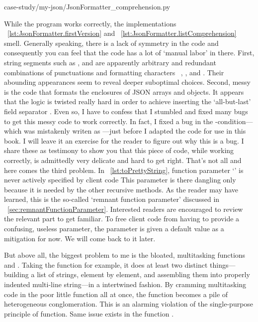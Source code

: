 
{case-study/my-json/JsonFormatter_comprehension.py}

While the program works correctly,
the implementations ~\autoref{lst:JsonFormatter.firstVersion} and
~\autoref{lst:JsonFormatter.listComprehension} smell.
Generally speaking, there is a lack of symmetry in the code and consequently
you can feel that the code has a lot of `manual labor' in there.
First, string segments such as  ,  and
\code{"[\\n"} are apparently arbitrary and redundant combinations of
punctuations and formatting characters
\ , , \code{"["} and .
Their abounding appearances seem to reveal deeper suboptimal choices.
Second, messy is the code that formats the enclosures of JSON arrays and objects.
It appears that the logic is
twisted really hard in order to achieve inserting the `all-but-last' field separator .
Even so, I have to confess that I stumbled and fixed many bugs to get this messy code to work
correctly.
In fact, I fixed a bug in the -condition---which was
mistakenly writen as ---just before I adapted the code for use in this book.
I will leave it an exercise for the reader to figure out why this is a bug.
I share these as testimony to show you that
this piece of code, while working correctly, is admittedly very delicate and hard to get right.
That's not all and here comes the third problem.
In ~\autoref{lst:toPrettyString}, function parameter `' is
never actively specified by client code
This parameter is there dangling only because it is needed by the other recursive methods.
As the reader may have learned, this is the so-called `remnant function parameter' discussed
in ~\autoref{sec:remnantFunctionParameter}.
Interested readers are encouraged to review the relevant part to get familiar.
To free client code from having to provide a confusing, useless parameter,
the parameter is given a default value  as a mitigation for now.
We will come back to it later.

But above all, the biggest problem to me is the bloated, multitasking functions
 and .
Taking the function  for example,
it does at least two distinct
things---building a list of strings, element by element, and assembling
them into properly indented multi-line string---in a intertwined fashion.
By cramming multitasking code in the poor little function all at once,
the function becomes a pile of heterogeneous conglomeration.
This is an alarming violation of the single-purpose principle of function.
Same issue exists in the function .

